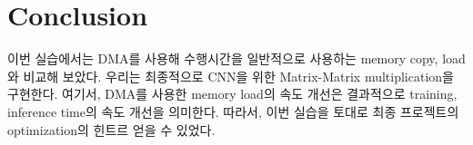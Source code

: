 \documentclass{article}
\begin{document}
\section{Conclusion}
이번 실습에서는 DMA를 사용해 수행시간을 일반적으로 사용하는 memory copy, load와 비교해 보았다.
우리는 최종적으로 CNN을 위한 Matrix-Matrix multiplication을 구현한다. 여기서, DMA를 사용한 memory load의 속도 개선은 결과적으로 training, inference time의 속도 개선을 의미한다. 따라서, 이번 실습을 토대로 최종 프로젝트의 optimization의 힌트르 얻을 수 있었다.



\end{document}
